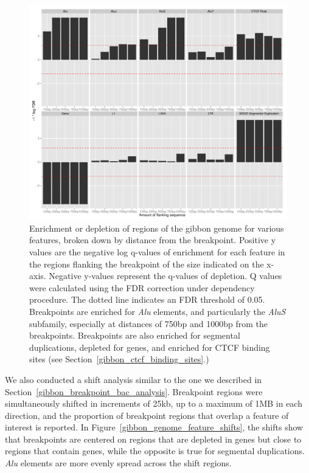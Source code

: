 \begin{figure}
\centering
\includegraphics[width=1\textwidth]{figures/regionHitQuantiles.pdf}
\caption[Enrichment or depletion of regions of the gibbon genome for various features, broken down by distance from the breakpoint.]{Enrichment or depletion of regions of the gibbon genome for various features, broken down by distance from the breakpoint. Positive y values are the negative log q-values of enrichment for each feature in the regions flanking the breakpoint of the size indicated on the x-axis. Negative y-values represent the q-values of depletion. Q values were calculated using the FDR correction under dependency procedure. The dotted line indicates an FDR threshold of 0.05. Breakpoints are enriched for \emph{Alu} elements, and particularly the \emph{AluS} subfamily, especially at distances of 750bp and 1000bp from the breakpoints. Breakpoints are also enriched for segmental duplications, depleted for genes, and enriched for CTCF binding sites (see Section~\ref{gibbon_ctcf_binding_sites}.)}
\label{gibbon_genome_enrich_by_distance}
\end{figure}

We also conducted a shift analysis similar to the one we described in Section~\ref{gibbon_breakpoint_bac_analysis}. Breakpoint regions were simultaneously shifted in increments of 25kb, up to a maximum of 1MB in each direction, and the proportion of breakpoint regions that overlap a feature of interest is reported. In Figure~\ref{gibbon_genome_feature_shifts}, the shifts show that breakpoints are centered on regions that are depleted in genes but close to regions that contain genes, while the opposite is true for segmental duplications. \emph{Alu} elements are more evenly spread across the shift regions.

